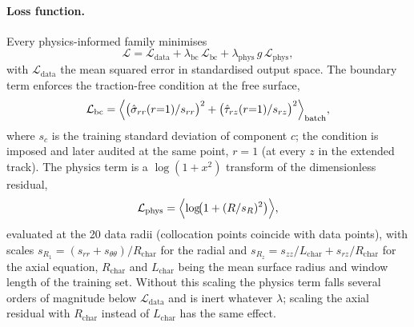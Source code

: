\paragraph{Loss function.}
Every physics-informed family minimises
\begin{equation}
  \mathcal{L} = \mathcal{L}_{\mathrm{data}}
              + \lambda_{\mathrm{bc}}\,\mathcal{L}_{\mathrm{bc}}
              + \lambda_{\mathrm{phys}}\,g\,\mathcal{L}_{\mathrm{phys}},
  \label{eq:loss}
\end{equation}
with $\mathcal{L}_{\mathrm{data}}$ the mean squared error in standardised output
space. The boundary term enforces the traction-free condition at the free
surface,
\begin{equation}
  \mathcal{L}_{\mathrm{bc}} = \Bigl\langle
     \bigl(\hat\sigma_{rr}(r{=}1)/s_{rr}\bigr)^2
   + \bigl(\hat\tau_{rz}(r{=}1)/s_{rz}\bigr)^2 \Bigr\rangle_{\mathrm{batch}},
  \label{eq:lbc}
\end{equation}
where $s_c$ is the training standard deviation of component $c$; the condition is
imposed and later audited at the same point, $r=1$ (at every $z$ in the extended
track). The physics term is a $\log(1+x^2)$ transform of the dimensionless
residual,
\begin{equation}
  \mathcal{L}_{\mathrm{phys}} = \Bigl\langle \log\!\bigl(1 + (R/s_R)^2\bigr) \Bigr\rangle,
  \label{eq:lphys}
\end{equation}
evaluated at the 20 data radii (collocation points coincide with data points),
with scales $s_{R_1}=(s_{rr}+s_{\theta\theta})/R_{\mathrm{char}}$ for the radial and
$s_{R_z}=s_{zz}/L_{\mathrm{char}}+s_{rz}/R_{\mathrm{char}}$ for the axial equation,
$R_{\mathrm{char}}$ and $L_{\mathrm{char}}$ being the mean surface radius and window
length of the training set.
Without this scaling the physics term falls several orders of magnitude below
$\mathcal{L}_{\mathrm{data}}$ and is inert whatever $\lambda$; scaling the axial
residual with $R_{\mathrm{char}}$ instead of $L_{\mathrm{char}}$ has the same effect.

